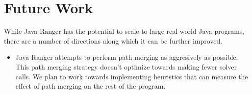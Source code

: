 \section{Future Work}
While Java Ranger has the potential to scale to large real-world Java programs, there are a number of directions along
which it can be further improved.
\begin{itemize}

\item Java Ranger attempts to perform path merging as aggresively as possible. This path merging strategy doesn't
optimize towards making fewer solver calls. We plan to work towards implementing heuristics that
can measure the effect of path merging on the rest of the program.
    
%


\end{itemize}
